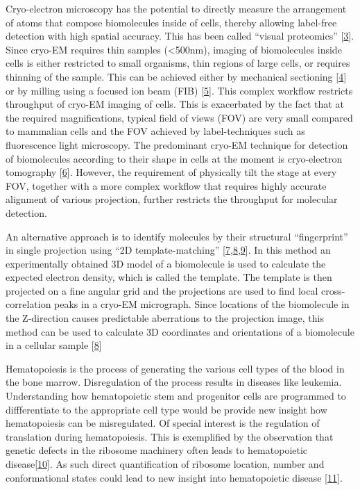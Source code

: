 \documentclass[
]{article}
\begin{document}
Cryo-electron microscopy has the potential to directly measure the arrangement
of atoms that compose biomolecules inside of cells, thereby allowing label-free
detection with high spatial accuracy. This has been called ``visual proteomics''
{[}\protect\hyperlink{ref-tGQ6TSUo}{3}{]}. Since cryo-EM requires thin samples (\textless500nm), imaging of
biomolecules inside cells is either restricted to small organisms, thin
regions of large cells, or requires thinning of the sample. This can be achieved
either by mechanical sectioning {[}\protect\hyperlink{ref-g8QavfwP}{4}{]} or by
milling using a focused ion beam (FIB) {[}\protect\hyperlink{ref-16IhS1Nc4}{5}{]}. This
complex workflow restricts throughput of cryo-EM imaging of cells. This is
exacerbated by the fact that at the required magnifications, typical field of
views (FOV) are very small compared to mammalian cells and the FOV achieved by
label-techniques such as fluorescence light microscopy. The predominant cryo-EM
technique for detection of biomolecules according to their shape in cells at the
moment is cryo-electron tomography {[}\protect\hyperlink{ref-Rksh2dxu}{6}{]}. However,
the requirement of physically tilt the stage at every FOV, together with a more
complex workflow that requires highly accurate alignment of various projection,
further restricts the throughput for molecular detection.

An alternative approach is to identify molecules by their structural
``fingerprint'' in single projection using ``2D template-matching''
{[}\protect\hyperlink{ref-Ynb3IP6I}{7},\protect\hyperlink{ref-18KGpXYPE}{8},\protect\hyperlink{ref-10bXZuF3G}{9}{]}. In this method an experimentally obtained 3D model
of a biomolecule is used to calculate the expected electron density, which is
called the template. The template is then projected on a fine angular grid and
the projections are used to find local cross-correlation peaks in a cryo-EM
micrograph. Since locations of the biomolecule in the Z-direction causes
predictable aberrations to the projection image, this method can be used to
calculate 3D coordinates and orientations of a biomolecule in a cellular sample
{[}\protect\hyperlink{ref-18KGpXYPE}{8}{]}

Hematopoiesis is the process of generating the various cell types of the blood in
the bone marrow. Disregulation of the process results in diseases like leukemia.
Understanding how hematopoietic stem and progenitor cells are programmed to
diffferentiate to the appropriate cell type would be provide new insight how
hematopoiesis can be misregulated. Of special interest is the regulation of
translation during hematopoiesis. This is exemplified by the observation that
genetic defects in the ribosome machinery often leads to hematopoietic
disease{[}\protect\hyperlink{ref-gRoY21jY}{10}{]}. As such direct quantification of ribosome
location, number and conformational states could lead to new insight into
hematopoietic disease {[}\protect\hyperlink{ref-KAJ7221k}{11}{]}.
\end{document}
